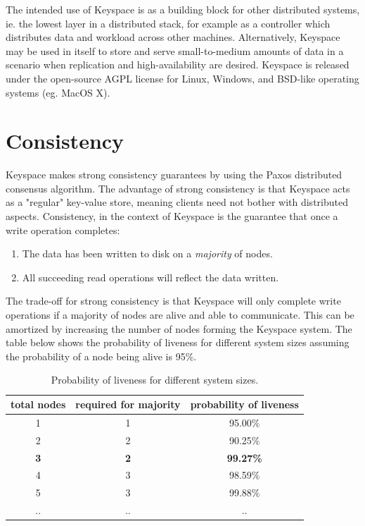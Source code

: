 \documentclass[12pt]{article}
\begin{document}
The intended use of Keyspace is as a building block for other distributed systems, ie. the lowest layer in a distributed stack, for example as a controller which distributes data and workload across other machines. Alternatively, Keyspace may be used in itself to store and serve small-to-medium amounts of data in a scenario when replication and high-availability are desired. Keyspace is released under the open-source AGPL license for Linux, Windows, and BSD-like operating systems (eg. MacOS X).

\section{ Consistency }

Keyspace makes strong consistency guarantees by using the Paxos distributed consensus algorithm. The advantage of strong consistency is that Keyspace acts as a "regular" key-value store, meaning clients need not bother with distributed aspects. Consistency, in the context of Keyspace is the guarantee that once a write operation completes:

\begin{enumerate}
\item The data has been written to disk on a \textit{majority} of nodes.
\item All succeeding read operations will reflect the data written.
\end{enumerate}

The trade-off for strong consistency is that Keyspace will only complete write operations if a majority of nodes are alive and able to communicate. This can be amortized by increasing the number of nodes forming the Keyspace system. The table below shows the probability of liveness for different system sizes assuming the probability of a node being alive is 95\%.

\begin{table}[h]
\begin{center}
\begin{tabular}{ | c | c | c | }
\hline
total nodes & required for majority & probability of liveness \\
\hline \hline
1 & 1 & 95.00\% \\ \hline
2 & 2 & 90.25\% \\ \hline
\textbf{3} & \textbf{2} & \textbf{99.27\%} \\ \hline
4 & 3 & 98.59\% \\ \hline
5 & 3 & 99.88\% \\ \hline
.. & .. & .. \\ \hline
\end{tabular}
\caption{ Probability of liveness for different system sizes. }
\end{center}
\end{table}
\end{document}
